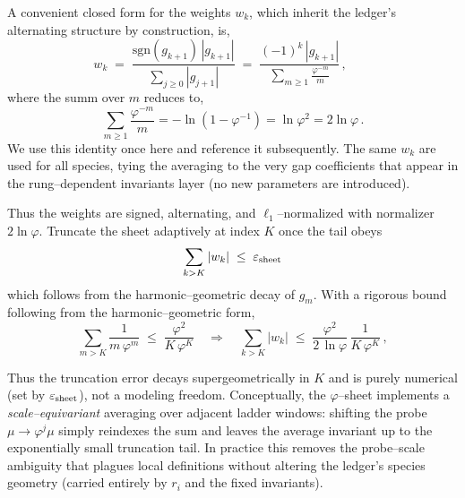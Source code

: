 \documentclass[%
 amsmath,amssymb,
 aps,
prb,
floatfix, showkeys
]{revtex4-2}
\begin{document}
A convenient closed form for the weights $w_k$, which inherit the ledger’s alternating structure by construction, is,
\begin{equation}
  w_k \;=\; \frac{\mathrm{sgn}(g_{k+1})\,|g_{k+1}|}{\sum_{j\ge 0} |g_{j+1}|}
  \;=\; \frac{(-1)^k\,|g_{k+1}|}{\displaystyle \sum_{m\ge 1} \frac{\varphi^{-m}}{m}}\,,\qquad
  \label{eq:wk_closed_form}
\end{equation}
where the summ over $m$ reduces to, 
\begin{equation}
  \sum_{m\ge 1} \frac{\varphi^{-m}}{m} = -\ln(1-\varphi^{-1}) = \ln \varphi^2   = 2\ln\varphi\,.
  \label{eq:wk_closed_form_1}
\end{equation}
We use this identity once here and reference it subsequently.
The same $w_k$ are used for all species, tying the averaging to the very gap coefficients
that appear in the rung--dependent invariants layer (no new parameters are introduced).


Thus the weights are signed, alternating, and $\ell_1$–normalized with
normalizer $2\ln\varphi$. Truncate the sheet adaptively at index $K$ once the tail obeys
\begin{equation}
  \sum_{k>K} |w_k| \;\le\; \varepsilon_{\rm sheet}  %
  \label{eq:sheet_tail_bound}
\end{equation}
which follows from the harmonic–geometric decay of $g_m$.
With a rigorous bound following from the harmonic–geometric form, 
\begin{equation}
 \sum_{m>K}\frac{1}{m\,\varphi^m}
\;\le\; \frac{\varphi^2}{K\,\varphi^{K}}
\quad\Rightarrow\quad
 \sum_{k>K} |w_k| \;\le\; \frac{\varphi^{2}}{2\,\ln\varphi}\,\frac{1}{K\,\varphi^{K}}\,,
  \label{eq:sheet_tail_bound}
\end{equation}




Thus the truncation error decays supergeometrically in $K$ and is purely numerical
(set by $\varepsilon_{\rm sheet}$), not a modeling freedom.
Conceptually, the $\varphi$--sheet implements a \emph{scale–equivariant} averaging over
adjacent ladder windows: shifting the probe $\mu\!\to\!\varphi^j\mu$ simply reindexes
the sum and leaves the average invariant up to the exponentially small truncation tail.
In practice this removes the probe--scale ambiguity that plagues local definitions without
altering the ledger’s species geometry (carried entirely by $r_i$ and the fixed invariants).
\end{document}
